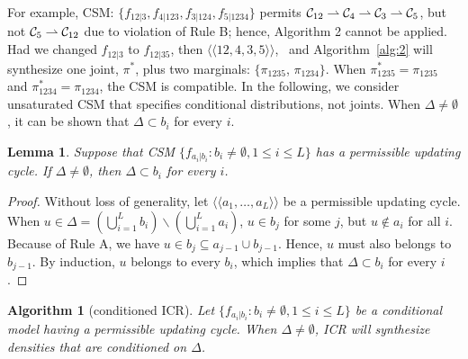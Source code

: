 \documentclass[12pt,a4paper]{article}
\newtheorem{lemma}[definition]{Lemma}
\newtheorem{alg}{Algorithm}
\begin{document}
For example, CSM: $\{f_{12|3}, f_{4|123}, f_{3|124}, f_{5|1234}\}$
permits ${\cal C}_{12}\rightharpoonup {\cal C}_{4}\rightharpoonup {\cal C}_{3} \rightharpoonup {\cal C}_{5}$, but not ${\cal C}_{5} \rightharpoonup {\cal C}_{12}$ due to violation of Rule B; hence, Algorithm 2 cannot be applied.  Had  we  changed $f_{12|3}$ to $f_{12|35}$, then $\langle \langle 12,4,3,5\rangle \rangle$,%
~and Algorithm~\ref{alg:2} will synthesize one joint, $\pi^*$, plus two  marginals:  $\{\pi_{1235}$, $\pi_{1234} \}$.
When $\pi^*_{1235}=\pi_{1235}$  and $\pi^*_{1234}=\pi_{1234}$,
the CSM is compatible.   In the following, we consider unsaturated CSM that specifies conditional distributions, not joints.   When $\Delta \ne \emptyset$, it can be shown that $\Delta \subset b_{i}$ for every $i$.

\begin{lemma}
Suppose that CSM
$\{f_{a_{i}|b_{i}}: b_{i} \ne \emptyset, 1 \le i \le L\}$
has a permissible updating cycle.
If $\Delta \ne \emptyset$, then $\Delta \subset b_{i}$ for every $i$.
\end{lemma}
\begin{proof}
Without loss of generality,
let $\langle \langle a_1,\ldots, a_L\rangle \rangle$ be a permissible updating cycle.
When $u\in \Delta=(\bigcup_{i=1}^{L} b_i) \backslash (\bigcup_{i=1}^{L} a_i)$,
 $u\in b_j$ for some $j$, but $u\not\in a_i$ for all $i$.
Because of {\sf Rule A}, we have $u\in b_j\subseteq a_{j-1}\cup b_{j-1}$.
Hence, $u$ must also belongs to $b_{j-1}$. By induction, $u$ belongs to every $b_i$,
which implies that $\Delta \subset b_{i}$ for every $i$.
\end{proof}

\begin{alg}[conditioned ICR]\label{alg:3}\rm
Let $\{ f_{a_{i}|b_{i}}: b_{i} \ne \emptyset, 1 \le i \le L\}$
be a conditional model having a permissible updating cycle.
When $\Delta \ne \emptyset$, ICR will synthesize densities that are conditioned on $\Delta$.
\end{alg}


\end{document}

